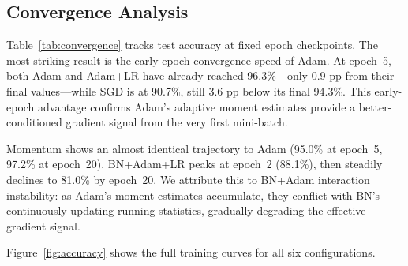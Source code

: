 \documentclass[conference]{IEEEtran}
\begin{document}
\begin{table}[htbp]
\caption{Optimizer Comparison — Final Test Accuracy (20 Epochs)}
\begin{center}
\label{tab:optimizer}
\end{center}
\end{table}

\subsection{Convergence Analysis}

Table~\ref{tab:convergence} tracks test accuracy at fixed epoch checkpoints. The most striking result is the early-epoch convergence speed of Adam. At epoch~5, both Adam and Adam+LR have already reached 96.3\%—only 0.9 pp from their final values—while SGD is at 90.7\%, still 3.6 pp below its final 94.3\%. This early-epoch advantage confirms Adam's adaptive moment estimates provide a better-conditioned gradient signal from the very first mini-batch.

Momentum shows an almost identical trajectory to Adam (95.0\% at epoch~5, 97.2\% at epoch~20). BN+Adam+LR peaks at epoch~2 (88.1\%), then steadily declines to 81.0\% by epoch~20. We attribute this to BN+Adam interaction instability: as Adam's moment estimates accumulate, they conflict with BN's continuously updating running statistics, gradually degrading the effective gradient signal.

Figure~\ref{fig:accuracy} shows the full training curves for all six configurations.
\end{document}
